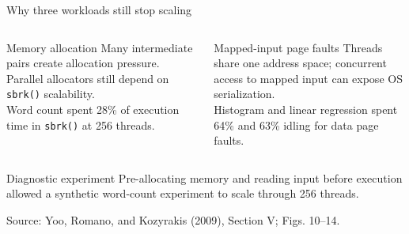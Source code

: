 \documentclass[aspectratio=169,11pt]{beamer}
\newcommand{\src}[1]{\vfill{\tiny\color{gray}Source: Yoo, Romano, and Kozyrakis (2009), #1.}}
\begin{document}
\begin{frame}{Why three workloads still stop scaling}
\begin{columns}[T]
\begin{block}{Memory allocation}
Many intermediate pairs create allocation pressure. Parallel allocators still depend on \texttt{sbrk()} scalability.\\[.2cm]
Word count spent 28\% of execution time in \texttt{sbrk()} at 256 threads.
\end{block}
\begin{block}{Mapped-input page faults}
Threads share one address space; concurrent access to mapped input can expose OS serialization.\\[.2cm]
Histogram and linear regression spent 64\% and 63\% idling for data page faults.
\end{block}
\end{columns}
\begin{alertblock}{Diagnostic experiment}
Pre-allocating memory and reading input before execution allowed a synthetic word-count experiment to scale through 256 threads.
\end{alertblock}
\src{Section V; Figs. 10--14}
\end{frame}
\end{document}
